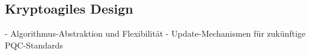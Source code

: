 \subsection{Kryptoagiles Design} \label{sec:Kryptoagiles Design}

- Algorithmus-Abstraktion und Flexibilität
- Update-Mechanismen für zukünftige PQC-Standards